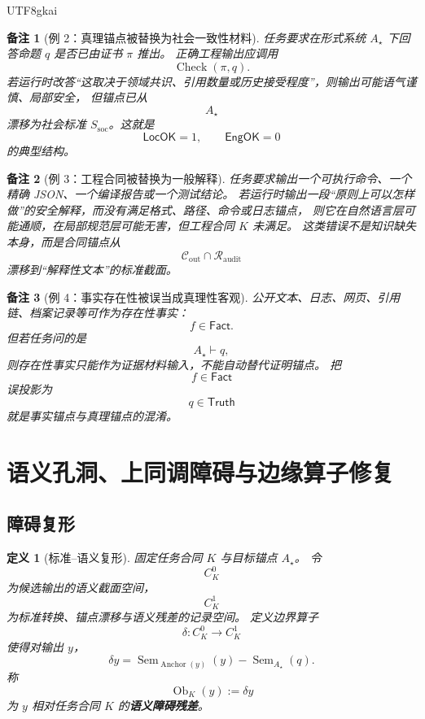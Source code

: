 \documentclass[12pt]{article}
\newtheorem{definition}{定义}[section]
\newtheorem{remark}{备注}[section]
\newcommand{\Truth}{\mathsf{Truth}}
\newcommand{\Fact}{\mathsf{Fact}}
\newcommand{\LocOK}{\mathsf{LocOK}}
\newcommand{\EngOK}{\mathsf{EngOK}}
\newcommand{\Sem}{\operatorname{Sem}}
\newcommand{\GCheck}{\operatorname{Check}}
\newcommand{\Anchor}{\operatorname{Anchor}}
\newcommand{\Ob}{\operatorname{Ob}}
\begin{document}
\begin{CJK*}{UTF8}{gkai}
\begin{remark}[例 2：真理锚点被替换为社会一致性材料]
任务要求在形式系统 \(A_\star\) 下回答命题 \(q\) 是否已由证书 \(\pi\) 推出。
  正确工程输出应调用
\[
  \GCheck(\pi,q).
\]
若运行时改答“这取决于领域共识、引用数量或历史接受程度”，则输出可能语气谨慎、局部安全，
但锚点已从
\[
  A_\star
\]
漂移为社会标准 \(S_{\mathrm{soc}}\)。这就是
\[
  \LocOK=1,\qquad \EngOK=0
\]
的典型结构。
\end{remark}

\begin{remark}[例 3：工程合同被替换为一般解释]
任务要求输出一个可执行命令、一个精确 JSON、一个编译报告或一个测试结论。
若运行时输出一段“原则上可以怎样做”的安全解释，而没有满足格式、路径、命令或日志锚点，
则它在自然语言层可能通顺，在局部规范层可能无害，但工程合同 \(K\) 未满足。
这类错误不是知识缺失本身，而是合同锚点从
\[
  \mathcal C_{\mathrm{out}}\cap\mathcal R_{\mathrm{audit}}
\]
漂移到“解释性文本”的标准截面。
\end{remark}

\begin{remark}[例 4：事实存在性被误当成真理性客观]
公开文本、日志、网页、引用链、档案记录等可作为存在性事实：
\[
  f\in\Fact.
\]
但若任务问的是
\[
  A_\star\vdash q,
\]
则存在性事实只能作为证据材料输入，不能自动替代证明锚点。
把
\[
  f\in\Fact
\]
误投影为
\[
  q\in\Truth
\]
就是事实锚点与真理锚点的混淆。
\end{remark}

\clearpage

\section{语义孔洞、上同调障碍与边缘算子修复}
\label{sec:tex51-obstruction}

\subsection{障碍复形}
\label{subsec:tex51-complex}

\begin{definition}[标准--语义复形]
固定任务合同 \(K\) 与目标锚点 \(A_\star\)。
令
\[
  C^0_K
\]
为候选输出的语义截面空间，
\[
  C^1_K
\]
为标准转换、锚点漂移与语义残差的记录空间。
定义边界算子
\[
  \delta:C^0_K\to C^1_K
\]
使得对输出 \(y\)，
\[
  \delta y
  =
  \Sem_{\Anchor(y)}(y)-\Sem_{A_\star}(q).
\]
称
\[
  \Ob_K(y):=\delta y
\]
为 \(y\) 相对任务合同 \(K\) 的\textbf{语义障碍残差}。
\end{definition}


\end{CJK*}
\end{document}
